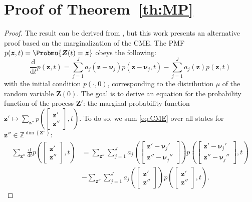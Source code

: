 \section{Proof of Theorem~\ref{th:MP}}
\label{sec:MP_proof}
\begin{proof}
    The result can be derived from \cite[Theorem~3.1]{Hammouda2023MP}, but this work presents an alternative proof based on the marginalization of the \ac{CME}.
    The \ac{PMF} $p(\boldsymbol{z}, t) = \Probmu{\boldsymbol{Z}(t) = \boldsymbol{z}}$ obeys the following:
    \begin{equation}
    \label{eq:CME}
        \frac{\mathrm{d}}{\mathrm{d} t} p(\boldsymbol{z}, t) = \sum_{j=1}^{J} a_j(\boldsymbol{z}-\boldsymbol{\nu}_j) p(\boldsymbol{z}-\boldsymbol{\nu}_j, t) - \sum_{j=1}^{J} a_j(\boldsymbol{z}) p(\boldsymbol{z}, t)
    \end{equation}
    with the initial condition $p(\cdot, 0)$, corresponding to the distribution $\mu$ of the random variable $\boldsymbol{Z}(0)$. The goal is to derive an equation for the probability function of the process $\boldsymbol{Z}'$: the marginal probability function $\boldsymbol{z}' \mapsto \sum\limits_{{\boldsymbol{z}}'' } p \left( \begin{bmatrix} \boldsymbol{z}' \\ {\boldsymbol{z}}'' \end{bmatrix}, t \right)$. To do so, we sum \eqref{eq:CME} over all states for $\boldsymbol{z}'' \in \mathbb{Z}^{\dim(\boldsymbol{Z}'')}$:
    \begin{align*}
        \sum_{{\boldsymbol{z}}'' } \frac{\mathrm{d}}{\mathrm{d} t} p \left( \begin{bmatrix} \boldsymbol{z}' \\ {\boldsymbol{z}}'' \end{bmatrix}, t \right) 
        &= \sum_{{\boldsymbol{z}}'' } \sum_{j=1}^{J} a_j \left( \begin{bmatrix} \boldsymbol{z}' - \boldsymbol{\nu}_j' \\ {\boldsymbol{z}}'' - \boldsymbol{\nu}_j'' \end{bmatrix} \right) p \left( \begin{bmatrix} \boldsymbol{z}' - \boldsymbol{\nu}_j' \\ {\boldsymbol{z}}'' - \boldsymbol{\nu}_j'' \end{bmatrix}, t \right)  \\
        &- \sum_{{\boldsymbol{z}}'' } \sum_{j=1}^{J} a_j \left( \begin{bmatrix} \boldsymbol{z}' \\ {\boldsymbol{z}}'' \end{bmatrix} \right) p \left( \begin{bmatrix} \boldsymbol{z}' \\ {\boldsymbol{z}}'' \end{bmatrix}, t \right).

\end{align*}
\end{proof}
